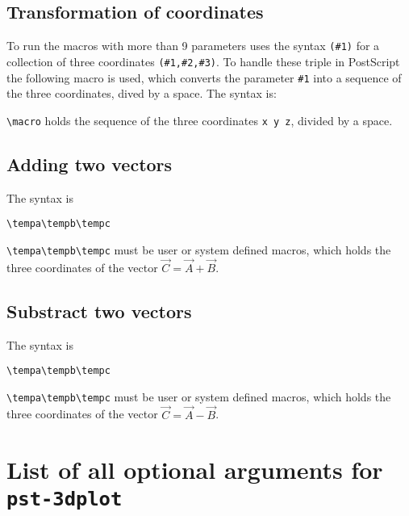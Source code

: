 \documentclass[11pt,english,BCOR10mm,DIV12,bibliography=totoc,parskip=false,smallheadings
    headexclude,footexclude,oneside,dvipsnames,svgnames]{pst-doc}
\begin{document}
\subsection{Transformation of coordinates}
To run the macros with more than 9 parameters  uses
the syntax \verb|(#1)| for a collection of three coordinates \verb|(#1,#2,#3)|.
To handle these triple in PostScript the following macro is used, which converts
the parameter \verb|#1| into a sequence of the three coordinates, dived by a space.
The syntax is:
%
\begin{BDef}
\end{BDef}

\verb|\macro| holds the sequence of the three coordinates \verb|x y z|, divided by a space.

\subsection{Adding two vectors}
The syntax is
\begin{BDef}
\verb+\tempa\tempb\tempc+
\end{BDef}

\verb|\tempa\tempb\tempc| must be user or system defined macros, which holds the three
coordinates of the vector $\vec{C}=\vec{A}+\vec{B}$.

\subsection{Substract two vectors}
The syntax is
\begin{BDef}
\verb+\tempa\tempb\tempc+
\end{BDef}

\verb|\tempa\tempb\tempc| must be user or system defined macros, which holds the three
coordinates of the vector $\vec{C}=\vec{A}-\vec{B}$.

\clearpage
\section{List of all optional arguments for \texttt{pst-3dplot}}



\bgroup
\nocite{*}
\raggedright


\egroup

\printindex
\end{document}
